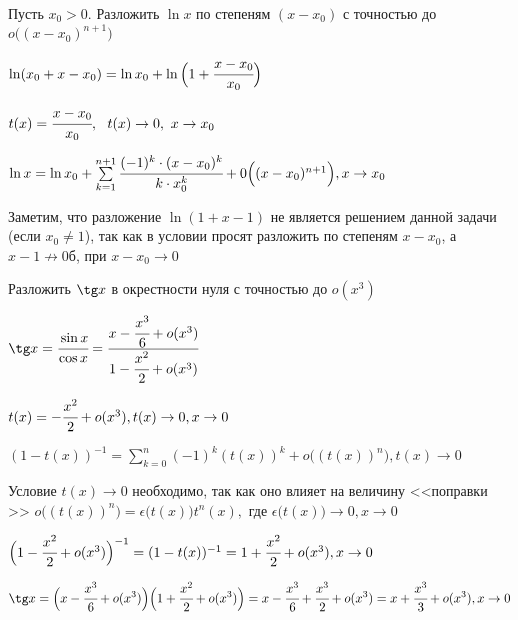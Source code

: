 \begin{problem}
	Пусть $x_{0} > 0.$ Разложить $\ln x$ по степеням $(x-x_{0})$ с точностью до $o\Big((x-x_{0})^{n+1}\Big)$
\end{problem}
\begin{solution}
	$\ln (x_{0} + x - x_{0}) = \ln x_{0} + \ln \Big(1 + \cfrac{x-x_{0}}{x_{0}} \Big)$
	
	$t(x) =  \cfrac{x-x_{0}}{x_{0}} , \ \ t(x) \to 0, \ x\to x_{0}$
	
	$ \ln x = \ln x_{0} + \sum\limits_{k = 1}^{n + 1} \cfrac{(-1)^{k} \cdot (x-x_{0})^{k}}{k\cdot x_{0}^{k}} + 0\Big((x-x_{0})^{n+1}\Big), x\to x_{0} $
\end{solution}
\begin{note}
	Заметим, что разложение $\ln (1 + x - 1)$ не является решением данной задачи (если $x_{0} \neq 1$), так как в условии просят разложить по степеням  $x-x_{0}$, а $x-1 \not \to 0б$, при $x-x_{0} \to 0$
\end{note}

\begin{problem}
	Разложить $ \tg x$ в окрестности нуля с точностью до $o(x^{3})$
\end{problem}
\begin{solution}
	$\tg x = \cfrac{\sin x}{\cos x} = \cfrac{x - \cfrac{x^{3}}{6} + o(x^{3})}{1 - \cfrac{x^{2}}{2} + o(x^{3})}$
	
	$t(x) = -\cfrac{x^{2}}{2} + o(x^{3}), t(x) \to 0, x\to 0 $
	
	$(1-t(x))^{-1} = \sum\limits_{k = 0}^{n} (-1)^{k} (t(x))^{k} + o\Big((t(x))^{n}\Big), t(x)\to 0$
	
	Условие  $ t(x) \to 0$ необходимо, так как оно влияет на величину <<поправки >> $o\Big((t(x))^{n}\Big) = \epsilon\Big(t(x)\Big)t^{n}(x),$ где $ \epsilon\Big(t(x)\Big) \to 0, x\to 0$
	
	$\Big(1 - \cfrac{x^{2}}{2} + o(x^{3})\Big)^{-1} = (1-t(x))^{-1} = 1 + \cfrac{x^{2}}{2} + o(x^{3}), x\to 0 $
	
	$$\tg x = \Big(x - \cfrac{x^{3}}{6} + o(x^{3})\Big)\Big(1 + \cfrac{x^{2}}{2} + o(x^{3})\Big) = x-\cfrac{x^{3}}{6} + \cfrac{x^{3}}{2} + o(x^{3}) = x + \cfrac{x^{3}}{3} +  o(x^{3}), x\to 0 $$
\end{solution}
